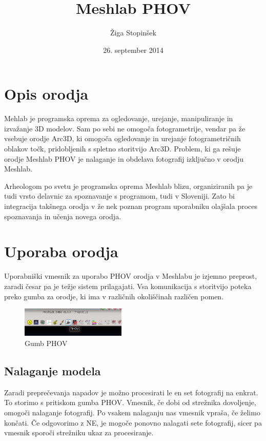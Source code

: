 \documentclass[11pt]{article}
\author{Žiga Stopinšek}
\date{26. september 2014}
\title{Meshlab PHOV}
\begin{document}
\maketitle
\section{Opis orodja}
\label{sec-1}
Mehlab je programska oprema za ogledovanje, urejanje, manipuliranje in izvažanje 3D modelov. Sam po sebi
ne omogoča fotogrametrije, vendar pa že vsebuje orodje Arc3D, ki omogoča ogledovanje in urejanje
fotogrametričnih oblakov točk, pridobljenih s spletno storitvijo Arc3D. Problem, ki ga rešuje
orodje Meshlab PHOV je nalaganje in obdelava fotografij izključno v orodju Meshlab.

Arheologom po svetu je programska oprema Meshlab blizu, organiziranih pa je tudi vrsto delavnic za
spoznavanje s programom, tudi v Sloveniji. Zato bi integracija takšnega orodja v že nek poznan
program uporabniku olajšala proces spoznavanja in učenja novega orodja.

\section{Uporaba orodja}
\label{sec-2}
Uporabniški vmesnik za uporabo PHOV orodja v Meshlabu je izjemno preprost, zaradi česar pa je težje sistem
prilagajati. Vsa komunikacija s storitvijo poteka preko gumba za orodje, ki ima v različnih okoliščinah
različen pomen. 

\begin{figure}[!htbp]
\centering
\includegraphics[width=5cm]{./icon.png}
\caption{\label{fig:icon}Gumb PHOV}
\end{figure}

\subsection{Nalaganje modela}
\label{sec-2-1}
Zaradi preprečevanja napadov je možno procesirati le en set fotografij na enkrat. To storimo s pritiskom
gumba PHOV. Vmesnik, če dobi od strežnika dovoljenje, omogoči nalaganje fotografij. Po vsakem nalaganju
nas vmesnik vpraša, če želimo končati. Če odgovorimo z NE, je mogoče ponovno nalagati sete fotografij, sicer
pa vmesnik sporoči strežniku ukaz za procesiranje.
\end{document}

